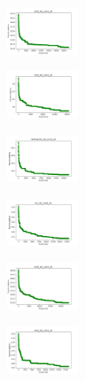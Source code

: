 \begin{figure}[H]
\begin{subfigure}
        \centering
        \includegraphics[width=0.234\textwidth]{img/hs/ecoli_set_const_20_589741062_cost.png}
    \end{subfigure}
    \hfill
    \begin{subfigure}
        \centering
        \includegraphics[width=0.234\textwidth]{img/hs/rand_set_const_20_589741062_cost.png}
    \end{subfigure}
    \hfill
    \begin{subfigure}
        \centering
        \includegraphics[width=0.234\textwidth]{img/hs/newthyroid_set_const_20_589741062_cost.png}
    \end{subfigure}
    \hfill
    \begin{subfigure}
        \centering
        \includegraphics[width=0.234\textwidth]{img/hs/iris_set_const_20_277451237_cost.png}
    \end{subfigure}
    \hfill
    \begin{subfigure}
        \centering
        \includegraphics[width=0.234\textwidth]{img/hs/ecoli_set_const_20_277451237_cost.png}
    \end{subfigure}
    \hfill
    \begin{subfigure}
        \centering
        \includegraphics[width=0.234\textwidth]{img/hs/rand_set_const_20_277451237_cost.png}

\end{subfigure}
\end{figure}
